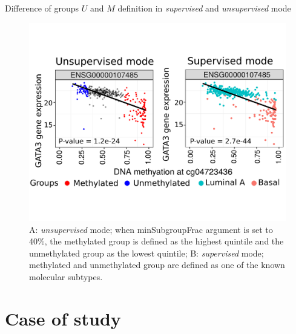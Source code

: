 \documentclass[slidestop,compress,11pt,xcolor=dvipsnames]{beamer}
\begin{document}
\begin{frame}{\normalsize{Difference of groups $U$ and $M$ definition in \textit{supervised} and \textit{unsupervised} mode}} 

 \vspace*{-0.3cm}
 \begin{figure}
 \centering
  \includegraphics[width=1.0\linewidth]{ELMER/painel_mode.pdf}
  \scriptsize{\caption{ A:  \textit{unsupervised} mode; when minSubgroupFrac argument is set to 40\%, the methylated group is defined as the highest quintile and the unmethylated group as the lowest quintile; B:  \textit{supervised} mode; methylated and unmethylated group are defined as one of the known molecular subtypes.}}
 \end{figure}
\end{frame}

\section{Case of study}
\end{document}
